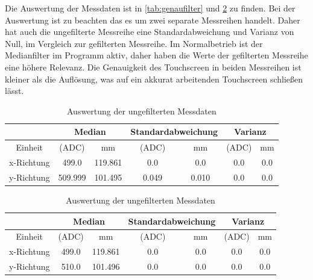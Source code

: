 Die Auswertung der Messdaten ist in \cref{tab:genaufilter} und \cref{tab:genauunfilter} zu finden.
Bei der Auswertung ist zu beachten das es um zwei separate Messreihen handelt.
Daher hat auch die ungefilterte Messreihe eine Standardabweichung und Varianz von Null, im Vergleich zur gefilterten Messreihe.
Im Normalbetrieb ist der Medianfilter im Programm aktiv, daher haben die Werte der gefilterten Messreihe eine höhere Relevanz.
Die Genauigkeit des Touchscreen in beiden Messreihen ist kleiner als die Auflösung, was auf ein akkurat arbeitenden Touchscreen schließen lässt.
\begin{table}[ht!]
    \caption{Auswertung der gefilterten Messdaten }
    \begin{center}
        \begin{tabular}{ |c|c|c|c|c|c|c| }
          \hline&\multicolumn{2}{c|}{Median}& \multicolumn{2}{c|}{Standardabweichung}&\multicolumn{2}{c|}{Varianz} \\ \hline
         Einheit    &(ADC)              &mm             &(ADC)          &mm             &(ADC)      &mm\\\hline
         x-Richtung & \SI{499,0}{}      & \SI{119,861}{}&\SI{0,0}{}     &\SI{0,0}{}     &\SI{0,0}{} & \SI{0,0}{} \\  \hline
         y-Richtung & \SI{509,999}{}    & \SI{101,495}{}&\SI{0,049}{}   &\SI{0,010}{}   &\SI{0,0}{} & \SI{0,0}{} \\ \hline  
        \end{tabular}
        \label{tab:genaufilter}
    \end{center}   
    \caption{Auswertung der ungefilterten Messdaten}
    \begin{center}
        \begin{tabular}{ |c|c|c|c|c|c|c| }
          \hline&\multicolumn{2}{c|}{Median}& \multicolumn{2}{c|}{Standardabweichung}&\multicolumn{2}{c|}{Varianz} \\ \hline
          Einheit &(ADC)&mm&(ADC)&mm&(ADC)&mm\\\hline
          x-Richtung & \SI{499,0}{} & \SI{119,861}{}&\SI{0,0}{}&\SI{0,0}{}&\SI{0,0}{} & \SI{0,0}{} \\  \hline
          y-Richtung & \SI{510,0}{} & \SI{101,496}{}&\SI{0,0}{}&\SI{0,0}{}&\SI{0,0}{} & \SI{0,0}{} \\ \hline  
        \end{tabular}
        \label{tab:genauunfilter}
    \end{center}   
\end{table}


